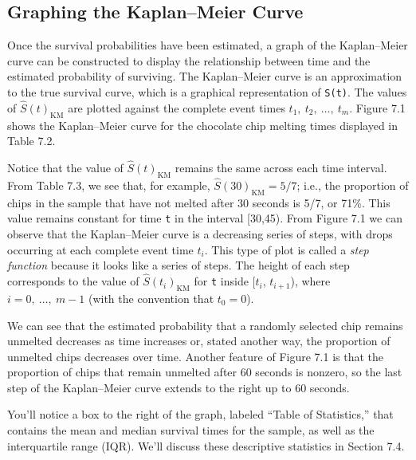 \documentclass[
]{report}
\begin{document}
\hypertarget{graphing-the-kaplanmeier-curve}{%
\subsection*{Graphing the Kaplan--Meier Curve}\label{graphing-the-kaplanmeier-curve}}

Once the survival probabilities have been estimated, a graph of the Kaplan--Meier curve can be constructed to display the relationship between time and the estimated probability of surviving. The Kaplan--Meier curve is an approximation to the true survival curve, which is a graphical representation of \texttt{S(t)}. The values of \(\scriptstyle \hat S(t)_{\mathrm{KM}}\) are plotted against the complete event times \(\scriptstyle t_1, \ t_2, \ \dots, \ t_m\). Figure 7.1 shows the Kaplan--Meier curve for the chocolate chip melting times displayed in Table 7.2.

Notice that the value of \(\scriptstyle \hat S(t)_{\mathrm{KM}}\) remains the same across each time interval. From Table 7.3, we see that, for example, \(\scriptstyle \hat S(30)_{\mathrm{KM}} = 5/7\); i.e., the proportion of chips in the sample that have not melted after 30 seconds is 5/7, or 71\%. This value remains constant for time \texttt{t} in the interval {[}30,45). From Figure 7.1 we can observe that the Kaplan--Meier curve is a decreasing series of steps, with drops occurring at each complete event time \(\scriptstyle t_i\). This type of plot is called a \emph{step function} because it looks like a series of steps. The height of each step corresponds to the value of \(\scriptstyle \hat S(t_i)_{\mathrm{KM}}\) for \texttt{t} inside {[}\(\scriptstyle t_i\), \(\scriptstyle t_{i+1}\)), where \(\scriptstyle i = 0,\ \dots,\ m-1\) (with the convention that \(t_0 = 0\)).

We can see that the estimated probability that a randomly selected chip remains unmelted decreases as time increases or, stated another way, the proportion of unmelted chips decreases over time. Another feature of Figure 7.1 is that the proportion of chips that remain unmelted after 60 seconds is nonzero, so the last step of the Kaplan--Meier curve extends to the right up to 60 seconds.

You'll notice a box to the right of the graph, labeled ``Table of Statistics,'' that contains the mean and median survival times for the sample, as well as the interquartile range (IQR). We'll discuss these descriptive statistics in Section 7.4.
\end{document}
